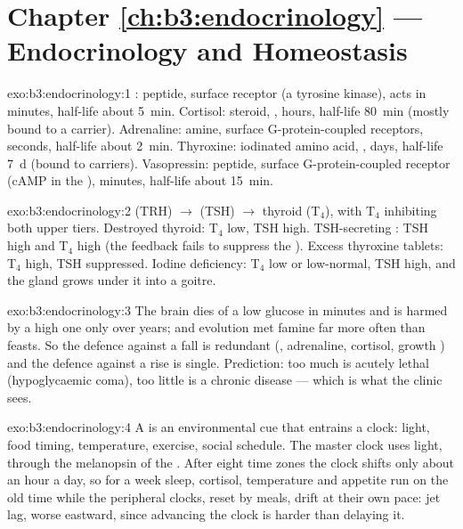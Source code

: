 \section*{Chapter \ref{ch:b3:endocrinology} --- Endocrinology and Homeostasis}

\begin{solution}{exo:b3:endocrinology:1}
: peptide, surface receptor (a tyrosine kinase), acts in
minutes, half-life about \qty{5}{min}. Cortisol: steroid, , hours, half-life \qty{80}{min} (mostly bound to a carrier).
Adrenaline: amine, surface G-protein-coupled receptors, seconds,
half-life about \qty{2}{min}. Thyroxine: iodinated amino acid, , days, half-life \qty{7}{d} (bound to carriers).
Vasopressin: peptide, surface G-protein-coupled receptor (cAMP in the
), minutes, half-life about \qty{15}{min}.
\end{solution}

\begin{solution}{exo:b3:endocrinology:2}
 (TRH) $\to$  (TSH) $\to$ thyroid (T$_{4}$), with
T$_{4}$ inhibiting both upper tiers. Destroyed thyroid: T$_{4}$ low,
TSH high. TSH-secreting : TSH high and T$_{4}$ high (the
feedback fails to suppress the ). Excess thyroxine tablets:
T$_{4}$ high, TSH suppressed. Iodine deficiency: T$_{4}$ low or
low-normal, TSH high, and the gland grows under it into a goitre.
\end{solution}

\begin{solution}{exo:b3:endocrinology:3}
The brain dies of a low glucose in minutes and is harmed by a high one
only over years; and evolution met famine far more often than feasts.
So the defence against a fall is redundant (, adrenaline,
cortisol, growth ) and the defence against a rise is single.
Prediction: too much  is acutely lethal (hypoglycaemic coma),
too little is a chronic disease --- which is what the clinic sees.
\end{solution}

\begin{solution}{exo:b3:endocrinology:4}
A  is an environmental cue that entrains a clock: light,
food timing, temperature, exercise, social schedule. The master clock
uses light, through the melanopsin  of the . After
eight time zones the clock shifts only about an hour a day, so for a
week sleep, cortisol, temperature and appetite run on the old time
while the peripheral clocks, reset by meals, drift at their own pace:
jet lag, worse eastward, since advancing the clock is harder than
delaying it.
\end{solution}

